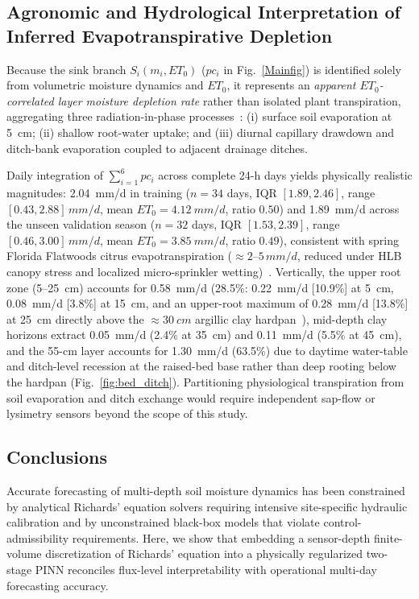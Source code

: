 \documentclass[pdflatex,sn-nature]{sn-jnl}%
\theoremstyle{thmstyleone}%
\theoremstyle{thmstyletwo}%
\theoremstyle{thmstylethree}%
\begin{document}
\subsection{Agronomic and Hydrological Interpretation of Inferred Evapotranspirative Depletion}\label{sec:uptake_rationale}

Because the sink branch $S_i(m_i, ET_0)$ ($pc_i$ in Fig.~\ref{Mainfig}) is identified solely from volumetric moisture dynamics and $ET_0$, it represents an \emph{apparent $ET_0$-correlated layer moisture depletion rate} rather than isolated plant transpiration, aggregating three radiation-in-phase processes~\cite{Feddes1978, allen1998crop}: (i) surface soil evaporation at 5~\si{cm}; (ii) shallow root-water uptake; and (iii) diurnal capillary drawdown and ditch-bank evaporation coupled to adjacent drainage ditches.

Daily integration of $\sum_{i=1}^{6} pc_i$ across complete 24-h days yields physically realistic magnitudes: \SI{2.04}{mm/d} in training ($n = 34$ days, IQR $[1.89, 2.46]$, range $[0.43, 2.88]\,\si{mm/d}$, mean $ET_0 = \SI{4.12}{mm/d}$, ratio $0.50$) and \SI{1.89}{mm/d} across the unseen validation season ($n = 32$ days, IQR $[1.53, 2.39]$, range $[0.46, 3.00]\,\si{mm/d}$, mean $ET_0 = \SI{3.85}{mm/d}$, ratio $0.49$), consistent with spring Florida Flatwoods citrus evapotranspiration ($\approx 2$--$5\,\si{mm/d}$, reduced under HLB canopy stress and localized micro-sprinkler wetting)~\cite{Morgan2006, Castle1993, allen1998crop}. Vertically, the upper root zone (5--25~\si{cm}) accounts for \SI{0.58}{mm/d} (28.5\%: \SI{0.22}{mm/d} [10.9\%] at 5~\si{cm}, \SI{0.08}{mm/d} [3.8\%] at 15~\si{cm}, and an upper-root maximum of \SI{0.28}{mm/d} [13.8\%] at 25~\si{cm} directly above the $\approx\SI{30}{cm}$ argillic clay hardpan~\cite{Morgan2006, Castle1993}), mid-depth clay horizons extract \SI{0.05}{mm/d} (2.4\% at 35~\si{cm}) and \SI{0.11}{mm/d} (5.5\% at 45~\si{cm}), and the 55-\si{cm} layer accounts for \SI{1.30}{mm/d} (63.5\%) due to daytime water-table and ditch-level recession at the raised-bed base rather than deep rooting below the hardpan (Fig.~\ref{fig:bed_ditch}). Partitioning physiological transpiration from soil evaporation and ditch exchange would require independent sap-flow or lysimetry sensors beyond the scope of this study.

\subsection{Conclusions}
Accurate forecasting of multi-depth soil moisture dynamics has been constrained by analytical Richards' equation solvers requiring intensive site-specific hydraulic calibration and by unconstrained black-box models that violate control-admissibility requirements. Here, we show that embedding a sensor-depth finite-volume discretization of Richards' equation into a physically regularized two-stage PINN reconciles flux-level interpretability with operational multi-day forecasting accuracy.
\end{document}
